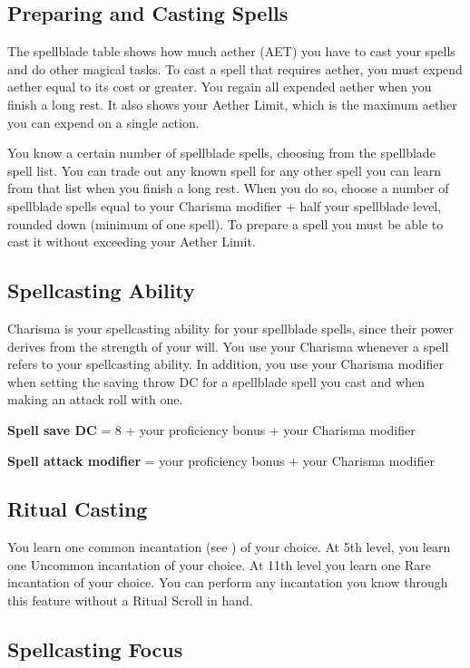 \subsection{Preparing and Casting Spells}

The spellblade table shows how much aether (AET) you have to cast your spells and do other magical tasks. To cast a spell that requires aether, you must expend aether equal to its cost or greater. You regain all expended aether when you finish a long rest. It also shows your Aether Limit, which is the maximum aether you can expend on a single action.

You know a certain number of spellblade spells, choosing from the spellblade spell list. You can trade out any known spell for any other spell you can learn from that list when you finish a long rest. When you do so, choose a number of spellblade spells equal to your Charisma modifier + half your spellblade level, rounded down (minimum of one spell). To prepare a spell you must be able to cast it without exceeding your Aether Limit.

\subsection{Spellcasting Ability}

Charisma is your spellcasting ability for your spellblade spells, since their power derives from the strength of your will. You use your Charisma whenever a spell refers to your spellcasting ability. In addition, you use your Charisma modifier when setting the saving throw DC for a spellblade spell you cast and when making an attack roll with one.

\textbf{Spell save DC} = 8 + your proficiency bonus + your Charisma modifier

\textbf{Spell attack modifier} = your proficiency bonus + your Charisma modifier

\subsection{Ritual Casting}

You learn one common incantation (see ) of your choice. At 5th level, you learn one Uncommon incantation of your choice. At 11th level you learn one Rare incantation of your choice. You can perform any incantation you know through this feature without a Ritual Scroll in hand.

\subsection{Spellcasting Focus}

